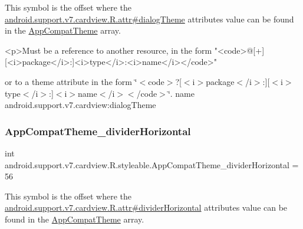 This symbol is the offset where the \hyperlink{classandroid_1_1support_1_1v7_1_1cardview_1_1R_1_1attr_a73935a8052ea75bfe3670af44157de18}{android.\+support.\+v7.\+cardview.\+R.\+attr\#dialog\+Theme} attribute\textquotesingle{}s value can be found in the \hyperlink{classandroid_1_1support_1_1v7_1_1cardview_1_1R_1_1styleable_a52e6f69f954ecc2622d72c0b4d298938}{App\+Compat\+Theme} array.

\begin{DoxyVerb}      <p>Must be a reference to another resource, in the form "<code>@[+][<i>package</i>:]<i>type</i>:<i>name</i></code>"
\end{DoxyVerb}
 or to a theme attribute in the form \char`\"{}$<$code$>$?\mbox{[}$<$i$>$package$<$/i$>$\+:\mbox{]}\mbox{[}$<$i$>$type$<$/i$>$\+:\mbox{]}$<$i$>$name$<$/i$>$$<$/code$>$\char`\"{}.  name android.\+support.\+v7.\+cardview\+:dialog\+Theme \mbox{\label{classandroid_1_1support_1_1v7_1_1cardview_1_1R_1_1styleable_ab43c9135bab4d1f11e5da417725ca828}} 
\subsubsection{\texorpdfstring{App\+Compat\+Theme\+\_\+divider\+Horizontal}{AppCompatTheme\_dividerHorizontal}}
{\footnotesize\ttfamily int android.\+support.\+v7.\+cardview.\+R.\+styleable.\+App\+Compat\+Theme\+\_\+divider\+Horizontal = 56\hspace{0.3cm}{\ttfamily [static]}}

This symbol is the offset where the \hyperlink{classandroid_1_1support_1_1v7_1_1cardview_1_1R_1_1attr_a9914d0b900074616aa5616908df332f2}{android.\+support.\+v7.\+cardview.\+R.\+attr\#divider\+Horizontal} attribute\textquotesingle{}s value can be found in the \hyperlink{classandroid_1_1support_1_1v7_1_1cardview_1_1R_1_1styleable_a52e6f69f954ecc2622d72c0b4d298938}{App\+Compat\+Theme} array.

